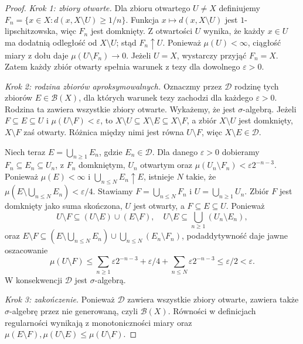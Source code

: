 \begin{proof}
\emph{Krok 1: zbiory otwarte.}
Dla zbioru otwartego $U\neq X$ definiujemy
$F_n=\{x\in X:d(x,X\setminus U)\ge1/n\}$.
Funkcja $x\mapsto d(x,X\setminus U)$ jest
$1$-lipschitzowska, więc $F_n$ jest domknięty.
Z otwartości $U$ wynika, że każdy $x\in U$
ma dodatnią odległość od $X\setminus U$;
stąd $F_n\uparrow U$. Ponieważ $\mu(U)<\infty$,
ciągłość miary z dołu daje
$\mu(U\setminus F_n)\to0$. Jeżeli $U=X$,
wystarczy przyjąć $F_n=X$. Zatem każdy zbiór otwarty
spełnia warunek z tezy dla dowolnego $\varepsilon>0$.

\emph{Krok 2: rodzina zbiorów aproksymowalnych.}
Oznaczmy przez $\mathcal D$ rodzinę tych zbiorów
$E\in\mathcal B(X)$, dla których warunek tezy zachodzi
dla każdego $\varepsilon>0$. Rodzina ta zawiera wszystkie
zbiory otwarte. Wykażemy, że jest $\sigma$-algebrą.
Jeżeli $F\subseteq E\subseteq U$ i
$\mu(U\setminus F)<\varepsilon$, to
$X\setminus U\subseteq X\setminus E\subseteq X\setminus F$,
a zbiór $X\setminus U$ jest domknięty,
$X\setminus F$ zaś otwarty. Różnica między nimi
jest równa $U\setminus F$, więc $X\setminus E\in\mathcal D$.

Niech teraz $E=\bigcup_{n\ge1}E_n$, gdzie $E_n\in\mathcal D$.
Dla danego $\varepsilon>0$ dobieramy
$F_n\subseteq E_n\subseteq U_n$, z $F_n$ domkniętym,
$U_n$ otwartym oraz
$\mu(U_n\setminus F_n)<\varepsilon2^{-n-3}$.
Ponieważ $\mu(E)<\infty$ i
$\bigcup_{n\le N}E_n\uparrow E$, istnieje $N$ takie,
że $\mu(E\setminus\bigcup_{n\le N}E_n)<\varepsilon/4$.
Stawiamy $F=\bigcup_{n\le N}F_n$ i $U=\bigcup_{n\ge1}U_n$.
Zbiór $F$ jest domknięty jako suma skończona,
$U$ jest otwarty, a $F\subseteq E\subseteq U$.
Ponieważ
\[
U\setminus F\subseteq
(U\setminus E)\cup(E\setminus F),
\quad
U\setminus E\subseteq\bigcup_{n\ge1}(U_n\setminus E_n),
\]
oraz
$E\setminus F\subseteq
(E\setminus\bigcup_{n\le N}E_n)
\cup\bigcup_{n\le N}(E_n\setminus F_n)$,
podaddytywność daje jawne oszacowanie
\[
 \mu(U\setminus F)\le
 \sum_{n\ge1}\varepsilon2^{-n-3}+
 \varepsilon/4+\sum_{n\le N}\varepsilon2^{-n-3}
 \le\varepsilon/2<\varepsilon.
\]
W konsekwencji $\mathcal D$ jest $\sigma$-algebrą.

\emph{Krok 3: zakończenie.}
Ponieważ $\mathcal D$ zawiera wszystkie zbiory otwarte,
zawiera także $\sigma$-algebrę przez nie generowaną,
czyli $\mathcal B(X)$. Równości w definicjach regularności
wynikają z monotoniczności miary oraz
$\mu(E\setminus F),\mu(U\setminus E)\le\mu(U\setminus F)$.
\end{proof}

